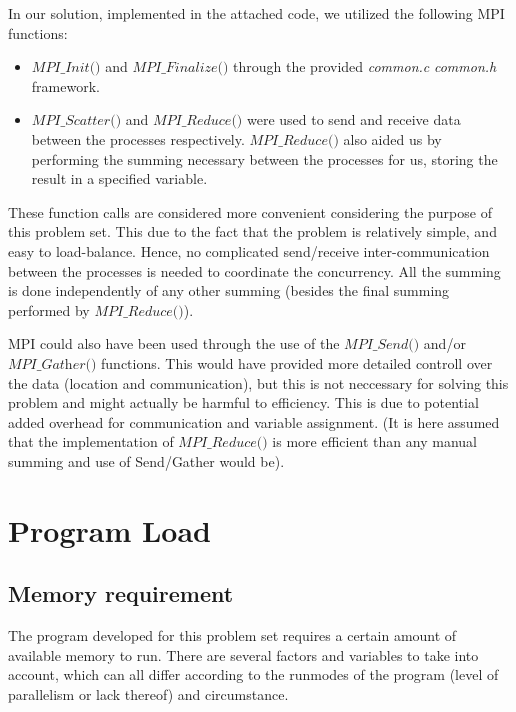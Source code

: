 \documentclass[fontsize=11pt,paper=a4,titlepage]{report}
\begin{document}
In our solution, implemented in the attached code, we utilized the following MPI
functions:
\begin{itemize}
	\item{$\textit{MPI\_Init()}$ and $\textit{
MPI\_Finalize()}$ through the provided \textit{common.c} \textit{common.h}
framework.}
	\item{$\textit{MPI\_Scatter()}$ and $\textit{MPI\_Reduce()}$ were used to
send and receive data between the processes respectively.
$\textit{MPI\_Reduce()}$ also aided us by performing the summing necessary
between the processes for us, storing the result in a specified variable.}
\end{itemize}

These function calls are considered more convenient considering the purpose of
this problem set. This due to the fact that the problem is relatively simple,
and easy to load-balance. Hence, no complicated send/receive inter-communication
between the processes is needed to coordinate the concurrency. All the summing
is done independently of any other summing (besides the final summing performed
by $\textit{MPI\_Reduce()}$).

MPI could also have been used through the use of  the $\textit{MPI\_Send()}$ 
and/or $\textit{MPI\_Gather()}$ functions. This would have provided more detailed
controll over the data (location and communication), but this is not neccessary for
solving this problem and might actually be harmful to efficiency. This is due to potential
added overhead for communication and variable assignment. (It is here assumed that the implementation
of $\textit{MPI\_Reduce()}$ is more efficient than any manual summing and use of Send/Gather would be).


\section{Program Load}

\subsection{Memory requirement}

The program developed for this problem set requires a certain amount of
available memory to run. There are several factors and variables to take into
account, which can all differ according to the runmodes of the program (level of
parallelism or lack thereof) and circumstance.
\end{document}
